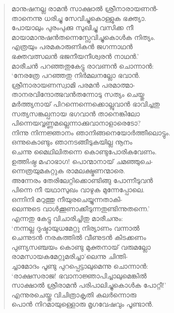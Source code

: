 \begin{verse}
മാനുഷനല്ല രാമന്‍ സാക്ഷാല്‍ ശ്രീനാരായണന്‍-\\
താനെന്നു ധരിച്ചു സേവിച്ചുകൊള്ളുക ഭക്ത്യാ.\\
പോയാലും പുരംപുക്കു സുഖിച്ചു വസിക്ക നീ\\
മായാമാനുഷന്‍തന്നെസ്സേവിച്ചുകൊള്‍ക നിത്യം.\\
എത്രയും പരമകാരുണികന്‍ ജഗന്നാഥന്‍\\
ഭക്തവത്സലന്‍ ഭജനീയനീശ്വരന്‍ നാഥന്‍.’\\
മാരീചന്‍ പറഞ്ഞതുകേട്ടു രാവണന്‍ ചൊന്നാന്‍:\\
‘നേരത്രേ പറഞ്ഞതു നിര്‍മലനല്ലോ ഭവാന്‍.\\
ശ്രീനാരായണസ്വാമി പരമന്‍ പരമാത്മാ-\\
താനരവിന്ദോത്ഭവന്‍തന്നോടു സത്യം ചെയ്തു\\
മര്‍ത്ത്യനായ് പിറന്നെന്നെക്കൊല്ലുവാന്‍ ഭാവിച്ചതു\\
സത്യസങ്കല്പനായ ഭഗവാന്‍ താനെങ്കിലോ\\
പിന്നെയവ്വണ്ണമല്ലെന്നാക്കുവാനാളാരെടോ?\\
നിന്നു നിന്നജ്ഞാനം ഞാനിങ്ങനെയോര്‍ത്തീലൊട്ടും.\\
ഒന്നുകൊണ്ടും ഞാനടങ്ങീടുകയില്ല നൂനം\\
ചെന്നു മൈഥിലിതന്നെ കൊണ്ടുപോരികവേണം.\\
ഉത്തിഷ്ഠ മഹാഭാഗ! പൊന്മാനായ് ചമഞ്ഞുചെ-\\
ന്നെത്രയുമകറ്റുക രാമലക്ഷ്മണന്മാരെ.\\
അന്നേരം തേരിലേറ്റിക്കൊണ്ടിങ്ങു പോന്നീടുവന്‍\\
പിന്നെ നീ യഥാസുഖം വാഴുക മുന്നേപ്പോലെ.\\
ഒന്നിനി മറുത്തു നീയുരചെയ്യുന്നതാകി-\\
ലെന്നുടെ വാള്‍ക്കൂണാക്കീടുന്നതുണ്ടിന്നുതന്നെ.’\\
എന്നതു കേട്ടു വിചാരിച്ചിതു മാരീചനും:\\
‘നന്നല്ല ദുഷ്ടായുധമേറ്റു നിര്യാണം വന്നാല്‍\\
ചെന്നുടന്‍ നരകത്തില്‍ വീണുടന്‍ കിടക്കണം\\
പുണ്യസഞ്ചയം കൊണ്ടു മുക്തനായ് വരുമല്ലോ\\
രാമസായകമേറ്റുമരിച്ചാ’ലെന്നു ചിന്തി-\\
ച്ചാമോദം പൂണ്ടു പുറപ്പെട്ടാലുമെന്നു ചൊന്നാന്‍:\\
‘രാക്ഷസരാജ! ഭവാനാജ്ഞാപിച്ചാലുമെങ്കില്‍\\
സാക്ഷാല്‍ ശ്രീരാമന്‍ പരിപാലിച്ചുകൊള്‍ക പോറ്റീ!’\\
എന്നുരചെയ്തു വിചിത്രാകൃതി കലര്‍ന്നൊരു\\
പൊന്‍ നിറമായുള്ളൊരു മൃഗവേഷവും പൂണ്ടാന്‍.\\

\end{verse}
